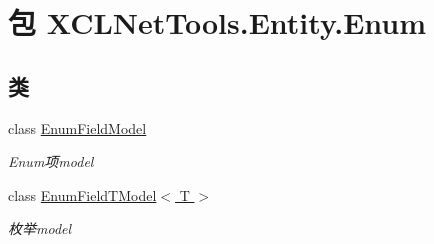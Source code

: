 \hypertarget{namespace_x_c_l_net_tools_1_1_entity_1_1_enum}{\section{包 X\-C\-L\-Net\-Tools.\-Entity.\-Enum}
\label{namespace_x_c_l_net_tools_1_1_entity_1_1_enum}
}
\subsection*{类}
\begin{DoxyCompactItemize}
\item 
class \hyperlink{class_x_c_l_net_tools_1_1_entity_1_1_enum_1_1_enum_field_model}{Enum\-Field\-Model}
\begin{DoxyCompactList}\small\item\em Enum项model \end{DoxyCompactList}\item 
class \hyperlink{class_x_c_l_net_tools_1_1_entity_1_1_enum_1_1_enum_field_t_model_3_01_t_01_4}{Enum\-Field\-T\-Model$<$ T $>$}
\begin{DoxyCompactList}\small\item\em 枚举model \end{DoxyCompactList}\end{DoxyCompactItemize}
